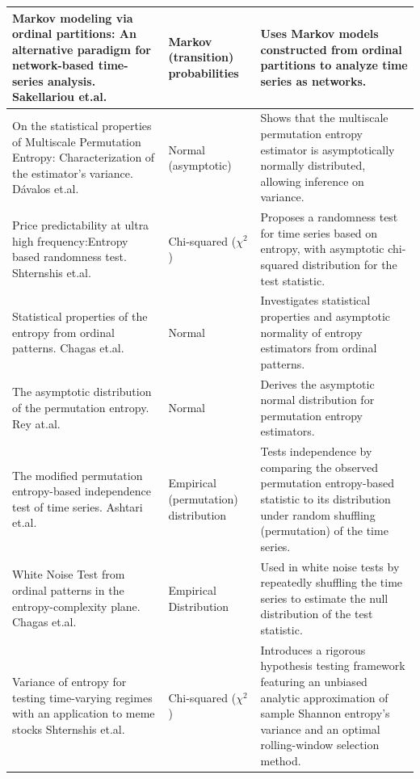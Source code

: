 \begin{longtable}{|p{5.5cm}|p{2.5cm}|p{6.5cm}|}
	\hline
	Markov modeling via ordinal partitions: An alternative paradigm for network-based time-series analysis. Sakellariou et.al.~\cite{Sakellariou2019} & Markov (transition) probabilities & Uses Markov models constructed from ordinal partitions to analyze time series as networks. \\
	\hline
	On the statistical properties of Multiscale Permutation Entropy: Characterization of the estimator's variance. Dávalos et.al.~\cite{Davalos2019a} & Normal (asymptotic) & Shows that the multiscale permutation entropy estimator is asymptotically normally distributed, allowing inference on variance.\\
	\hline
	Price predictability at ultra high frequency:Entropy based randomness test. Shternshis et.al.~\cite{Shternshis2025}& Chi-squared ($\chi^2$) & Proposes a randomness test for time series based on entropy, with asymptotic chi-squared distribution for the test statistic. \\
	\hline
	Statistical properties of the entropy from ordinal patterns. Chagas et.al.~\cite{Chagas2022} & Normal & Investigates statistical properties and asymptotic normality of entropy estimators from ordinal patterns. \\
	\hline
	The asymptotic distribution of the permutation entropy. Rey at.al.~\cite{Rey2023a} & Normal & Derives the asymptotic normal distribution for permutation entropy estimators. \\
	\hline
	The modified permutation entropy-based independence test of time series. Ashtari et.al.~\cite{AshtariNezhad2019} & Empirical (permutation) distribution & Tests independence by comparing the observed permutation entropy-based statistic to its distribution under random shuffling (permutation) of the time series.\\
	\hline
	White Noise Test from ordinal patterns in the entropy-complexity plane. Chagas et.al.~\cite{Chagas2022a} & Empirical Distribution & Used in white noise tests by repeatedly shuffling the time series to estimate the null distribution of the test statistic.\\
	\hline
	 Variance of entropy for testing time-varying regimes with an application to meme stocks Shternshis et.al.~\cite{Shternshis2024} & Chi-squared ($\chi^2$) & Introduces a rigorous hypothesis testing framework featuring an unbiased analytic approximation of sample Shannon entropy’s variance and an optimal rolling-window selection method.\\
	\hline
	
\end{longtable}









